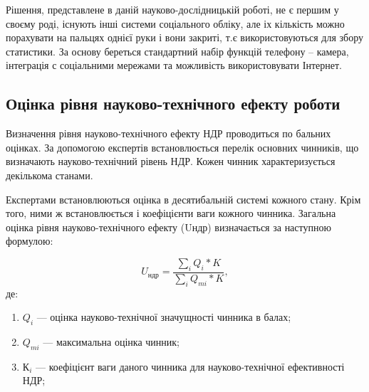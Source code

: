 Рішення, представлене в даній науково-дослідницькій роботі, не є першим у своєму роді, існують інші системи соціального обліку, але іх кількість можно порахувати на пальцях однієї руки і вони закриті, т.є використовуються для збору статистики. За основу береться стандартний набір функцій телефону – камера, інтеграція с соціальними мережами та можливість використовувати Інтернет.
    \subsection{Оцінка рівня науково-технічного ефекту роботи}
Визначення рівня науково-технічного ефекту НДР проводиться по бальних оцінках. За допомогою експертів встановлюється перелік основних чинників, що визначають науково-технічний рівень НДР. Кожен чинник характеризується декількома станами.

Експертами встановлюються оцінка в десятибальній системі кожного стану. Крім того, ними ж встановлюється і коефіцієнти ваги кожного чинника. Загальна оцінка рівня науково-технічного ефекту (Uндр) визначається за наступною формулою:
 
\begin{equation}
U_{ндр} =  \frac{\sum \limits_{i} Q_i * K}{\sum \limits_{i} Q_{mi} * K},
\end{equation}
де:
\begin{enumerate}
\item \mbox{$ Q_i $} --- оцінка науково-технічної значущності чинника в балах;
\item \mbox{$ Q_{mi} $} --- максимальна оцінка чинник;
\item \mbox{$ К_i $} --- коефіцієнт ваги даного чинника для науково-технічної ефективності НДР;
\end{enumerate}

